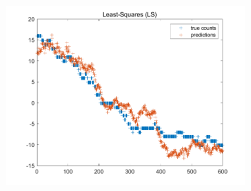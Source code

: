 \documentclass{article}
\begin{document}
\begin{figure}[H]
    \centering
    \includegraphics[width=0.8\textwidth]{fig/2c-ls.png}
\end{figure}
\end{document}
